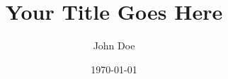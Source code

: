 \documentclass{article} %
\title {Your Title Goes Here}
\author {John Doe}
\date{\today}
\theoremstyle{mystyle}
\begin{document}

%









\begin{comment} %




\end{comment}




%
\end{document}
